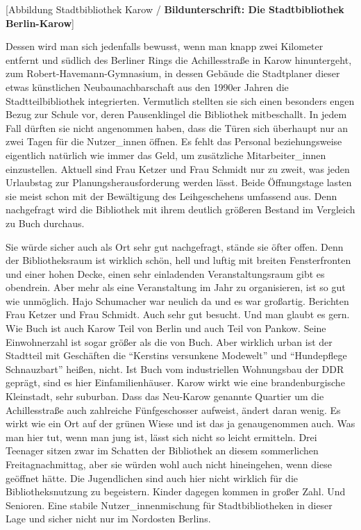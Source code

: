 \documentclass[a4paper,
fontsize=11pt,
oneside,
numbers=noperiodatend,
parskip=half-,
bibliography=totoc,
final
]{scrartcl}
\begin{document}
{[}Abbildung Stadtbibliothek Karow / \textbf{Bildunterschrift: Die
Stadtbibliothek Berlin-Karow}{]}

Dessen wird man sich jedenfalls bewusst, wenn man knapp zwei Kilometer
entfernt und südlich des Berliner Rings die Achillesstraße in Karow
hinuntergeht, zum Robert-Havemann-Gymnasium, in dessen Gebäude die
Stadtplaner dieser etwas künstlichen Neubaunachbarschaft aus den 1990er
Jahren die Stadtteilbibliothek integrierten. Vermutlich stellten sie
sich einen besonders engen Bezug zur Schule vor, deren Pausenklingel die
Bibliothek mitbeschallt. In jedem Fall dürften sie nicht angenommen
haben, dass die Türen sich überhaupt nur an zwei Tagen für die
Nutzer\_innen öffnen. Es fehlt das Personal beziehungsweise eigentlich
natürlich wie immer das Geld, um zusätzliche Mitarbeiter\_innen
einzustellen. Aktuell sind Frau Ketzer und Frau Schmidt nur zu zweit,
was jeden Urlaubstag zur Planungsherausforderung werden lässt. Beide
Öffnungstage lasten sie meist schon mit der Bewältigung des
Leihgeschehens umfassend aus. Denn nachgefragt wird die Bibliothek mit
ihrem deutlich größeren Bestand im Vergleich zu Buch durchaus.

Sie würde sicher auch als Ort sehr gut nachgefragt, stände sie öfter
offen. Denn der Bibliotheksraum ist wirklich schön, hell und luftig mit
breiten Fensterfronten und einer hohen Decke, einen sehr einladenden
Veranstaltungsraum gibt es obendrein. Aber mehr als eine Veranstaltung
im Jahr zu organisieren, ist so gut wie unmöglich. Hajo Schumacher war
neulich da und es war großartig. Berichten Frau Ketzer und Frau Schmidt.
Auch sehr gut besucht. Und man glaubt es gern. Wie Buch ist auch Karow
Teil von Berlin und auch Teil von Pankow. Seine Einwohnerzahl ist sogar
größer als die von Buch. Aber wirklich urban ist der Stadtteil mit
Geschäften die \enquote{Kerstins versunkene Modewelt} und
\enquote{Hundepflege Schnauzbart} heißen, nicht. Ist Buch vom
industriellen Wohnungsbau der DDR geprägt, sind es hier
Einfamilienhäuser. Karow wirkt wie eine brandenburgische Kleinstadt,
sehr suburban. Dass das Neu-Karow genannte Quartier um die
Achillesstraße auch zahlreiche Fünfgeschosser aufweist, ändert daran
wenig. Es wirkt wie ein Ort auf der grünen Wiese und ist das ja
genaugenommen auch. Was man hier tut, wenn man jung ist, lässt sich
nicht so leicht ermitteln. Drei Teenager sitzen zwar im Schatten der
Bibliothek an diesem sommerlichen Freitagnachmittag, aber sie würden
wohl auch nicht hineingehen, wenn diese geöffnet hätte. Die Jugendlichen
sind auch hier nicht wirklich für die Bibliotheksnutzung zu begeistern.
Kinder dagegen kommen in großer Zahl. Und Senioren. Eine stabile
Nutzer\_innenmischung für Stadtbibliotheken in dieser Lage und sicher
nicht nur im Nordosten Berlins.
\end{document}
